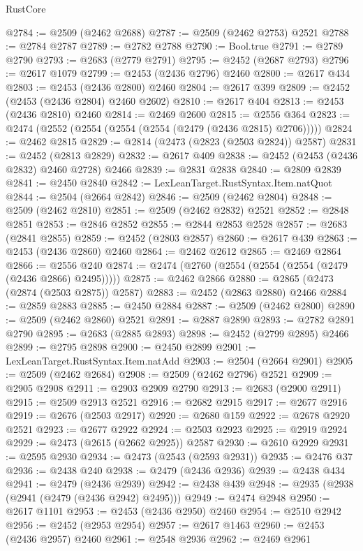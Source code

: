 \begin{lexlean}{RustCore}
\begin{coremodule}
@2784 := @2509 (@2462 @2688)
@2787 := @2509 (@2462 @2753) @2521
@2788 := @2784 @2787
@2789 := @2782 @2788
@2790 := Bool.true
@2791 := @2789 @2790
@2793 := @2683 (@2779 @2791)
@2795 := @2452 (@2687 @2793)
@2796 := @2617 @1079
@2799 := @2453 (@2436 @2796) @2460
@2800 := @2617 @434
@2803 := @2453 (@2436 @2800) @2460
@2804 := @2617 @399
@2809 := @2452 (@2453 (@2436 @2804) @2460 @2602)
@2810 := @2617 @404
@2813 := @2453 (@2436 @2810) @2460
@2814 := @2469 @2600
@2815 := @2556 @364
@2823 := @2474 (@2552 (@2554 (@2554 (@2554 (@2479 (@2436 @2815) @2706)))))
@2824 := @2462 @2815
@2829 := @2814 (@2473 (@2823 (@2503 @2824)) @2587)
@2831 := @2452 (@2813 @2829)
@2832 := @2617 @409
@2838 := @2452 (@2453 (@2436 @2832) @2460 @2728) @2466
@2839 := @2831 @2838
@2840 := @2809 @2839
@2841 := @2450 @2840
@2842 := LexLeanTarget.RustSyntax.Item.natQuot
@2844 := @2504 (@2664 @2842)
@2846 := @2509 (@2462 @2804)
@2848 := @2509 (@2462 @2810)
@2851 := @2509 (@2462 @2832) @2521
@2852 := @2848 @2851
@2853 := @2846 @2852
@2855 := @2844 @2853 @2528
@2857 := @2683 (@2841 @2855)
@2859 := @2452 (@2803 @2857)
@2860 := @2617 @439
@2863 := @2453 (@2436 @2860) @2460
@2864 := @2462 @2612
@2865 := @2469 @2864
@2866 := @2556 @240
@2874 := @2474 (@2760 (@2554 (@2554 (@2554 (@2479 (@2436 @2866) @2495)))))
@2875 := @2462 @2866
@2880 := @2865 (@2473 (@2874 (@2503 @2875)) @2587)
@2883 := @2452 (@2863 @2880) @2466
@2884 := @2859 @2883
@2885 := @2450 @2884
@2887 := @2509 (@2462 @2800)
@2890 := @2509 (@2462 @2860) @2521
@2891 := @2887 @2890
@2893 := @2782 @2891 @2790
@2895 := @2683 (@2885 @2893)
@2898 := @2452 (@2799 @2895) @2466
@2899 := @2795 @2898
@2900 := @2450 @2899
@2901 := LexLeanTarget.RustSyntax.Item.natAdd
@2903 := @2504 (@2664 @2901)
@2905 := @2509 (@2462 @2684)
@2908 := @2509 (@2462 @2796) @2521
@2909 := @2905 @2908
@2911 := @2903 @2909 @2790
@2913 := @2683 (@2900 @2911)
@2915 := @2509 @2913 @2521
@2916 := @2682 @2915
@2917 := @2677 @2916
@2919 := @2676 (@2503 @2917)
@2920 := @2680 @159
@2922 := @2678 @2920 @2521
@2923 := @2677 @2922
@2924 := @2503 @2923
@2925 := @2919 @2924
@2929 := @2473 (@2615 (@2662 @2925)) @2587
@2930 := @2610 @2929
@2931 := @2595 @2930
@2934 := @2473 (@2543 (@2593 @2931))
@2935 := @2476 @37
@2936 := @2438 @240
@2938 := @2479 (@2436 @2936)
@2939 := @2438 @434
@2941 := @2479 (@2436 @2939)
@2942 := @2438 @439
@2948 := @2935 (@2938 (@2941 (@2479 (@2436 @2942) @2495)))
@2949 := @2474 @2948
@2950 := @2617 @1101
@2953 := @2453 (@2436 @2950) @2460
@2954 := @2510 @2942
@2956 := @2452 (@2953 @2954)
@2957 := @2617 @1463
@2960 := @2453 (@2436 @2957) @2460
@2961 := @2548 @2936
@2962 := @2469 @2961

\end{coremodule}
\end{lexlean}
